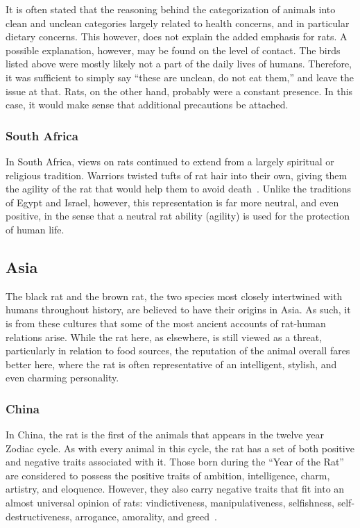 \documentclass[12pt]{article}
\begin{document}
It is often stated that the reasoning behind the categorization of animals into clean and unclean categories largely related to health concerns, and in particular dietary concerns. This however, does not explain the added emphasis for rats. A possible explanation, however, may be found on the level of contact. The birds listed above were mostly likely not a part of the daily lives of humans. Therefore, it was sufficient to simply say ``these are unclean, do not eat them,'' and leave the issue at that. Rats, on the other hand, probably were a constant presence. In this case, it would make sense that additional precautions be attached.

\subsubsection{South Africa} \label{South Africa}

In South Africa, views on rats continued to extend from a largely spiritual or religious tradition. Warriors twisted tufts of rat hair into their own, giving them the agility of the rat that would help them to avoid death~\cite{Barnett2001}. Unlike the traditions of Egypt and Israel, however, this representation is far more neutral, and even positive, in the sense that a neutral rat ability (agility) is used for the protection of human life.

\subsection{Asia} \label{Asia}

The black rat and the brown rat, the two species most closely intertwined with humans throughout history, are believed to have their origins in Asia. As such, it is from these cultures that some of the most ancient accounts of rat-human relations arise. While the rat here, as elsewhere, is still viewed as a threat, particularly in relation to food sources, the reputation of the animal overall fares better here, where the rat is often representative of an intelligent, stylish, and even charming personality.

\subsubsection{China} \label{China}

In China, the rat is the first of the animals that appears in the twelve year Zodiac cycle. As with every animal in this cycle, the rat has a set of both positive and negative traits associated with it. Those born during the ``Year of the Rat'' are considered to possess the positive traits of ambition, intelligence, charm, artistry, and eloquence. However, they also carry negative traits that fit into an almost universal opinion of rats: vindictiveness, manipulativeness, selfishness, self-destructiveness, arrogance, amorality, and greed~\cite{Barnett2001}.
\end{document}
